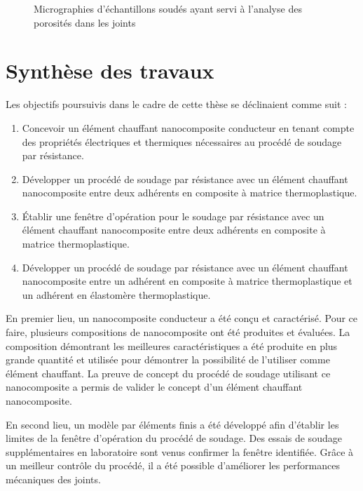 \begin{figure}[h!]
	\centering
	 \qquad
	\caption{Micrographies d'échantillons soudés ayant servi à l'analyse des porosités dans les joints}
	\label{fig:micro_analyse_porosite}
\end{figure}

\FloatBarrier
\section{Synthèse des travaux}

Les objectifs poursuivis dans le cadre de cette thèse se déclinaient comme suit : 

\begin{enumerate}
	\item Concevoir un élément chauffant nanocomposite conducteur en tenant compte des propriétés électriques et thermiques nécessaires au procédé de soudage par résistance. 
	\item Développer un procédé de soudage par résistance avec un élément chauffant nanocomposite entre deux adhérents en composite à matrice thermoplastique. 
	\item Établir une fenêtre d'opération pour le soudage par résistance avec un élément chauffant nanocomposite entre deux adhérents en composite à matrice thermoplastique. 
	\item Développer un procédé de soudage par résistance avec un élément chauffant nanocomposite entre un adhérent en composite à matrice thermoplastique et un adhérent en élastomère thermoplastique. 
\end{enumerate}

En premier lieu, un nanocomposite conducteur a été conçu et caractérisé. 
Pour ce faire, plusieurs compositions de nanocomposite ont été produites et évaluées. 
La composition démontrant les meilleures caractéristiques a été produite en plus grande quantité et utilisée pour démontrer la possibilité de l'utiliser comme élément chauffant. 
La preuve de concept du procédé de soudage utilisant ce nanocomposite a permis de valider le concept d'un élément chauffant nanocomposite. 

En second lieu, un modèle par éléments finis a été développé afin d'établir les limites de la fenêtre d'opération du procédé de soudage. 
Des essais de soudage supplémentaires en laboratoire sont venus confirmer la fenêtre identifiée. 
Grâce à un meilleur contrôle du procédé, il a été possible d'améliorer les performances mécaniques des joints. 

